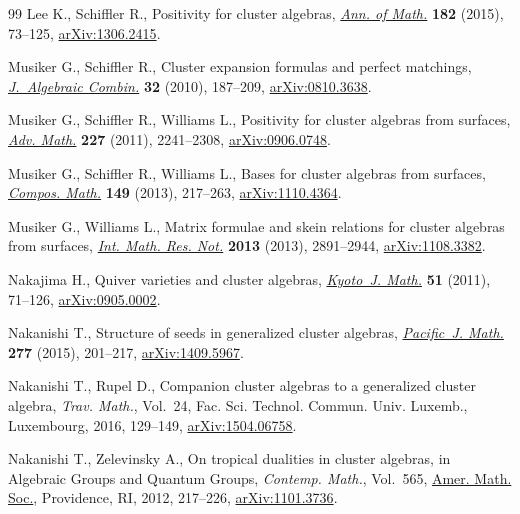 \documentclass[11pt]{article}
\numberwithin{equation}{section}
\begin{document}
\begin{thebibliography}{99}
Lee K., Schiffler R., Positivity for cluster algebras, \href{https://doi.org/10.4007/annals.2015.182.1.2}{\textit{Ann. of Math.}}
 \textbf{182} (2015), 73--125, \href{https://arxiv.org/abs/1306.2415}{arXiv:1306.2415}.

Musiker G., Schiffler R., Cluster expansion formulas and perfect matchings,
 \href{https://doi.org/10.1007/s10801-009-0210-3}{\textit{J.~Algebraic Combin.}} \textbf{32} (2010), 187--209,
 \href{https://arxiv.org/abs/0810.3638}{arXiv:0810.3638}.

Musiker G., Schiffler R., Williams L., Positivity for cluster algebras from
 surfaces, \href{https://doi.org/10.1016/j.aim.2011.04.018}{\textit{Adv. Math.}} \textbf{227} (2011), 2241--2308,
 \href{https://arxiv.org/abs/0906.0748}{arXiv:0906.0748}.

Musiker G., Schiffler R., Williams L., Bases for cluster algebras from
 surfaces, \href{https://doi.org/10.1112/S0010437X12000450}{\textit{Compos. Math.}} \textbf{149} (2013), 217--263,
 \href{https://arxiv.org/abs/1110.4364}{arXiv:1110.4364}.

Musiker G., Williams L., Matrix formulae and skein relations for cluster
 algebras from surfaces, \href{https://doi.org/10.1093/imrn/rns118}{\textit{Int. Math. Res. Not.}} \textbf{2013} (2013),
 2891--2944, \href{https://arxiv.org/abs/1108.3382}{arXiv:1108.3382}.

Nakajima H., Quiver varieties and cluster algebras, \href{https://doi.org/10.1215/0023608X-2010-021}{\textit{Kyoto~J. Math.}}
 \textbf{51} (2011), 71--126, \href{https://arxiv.org/abs/0905.0002}{arXiv:0905.0002}.

Nakanishi T., Structure of seeds in generalized cluster algebras,
 \href{https://doi.org/10.2140/pjm.2015.277.201}{\textit{Pacific~J. Math.}} \textbf{277} (2015), 201--217, \href{https://arxiv.org/abs/1409.5967}{arXiv:1409.5967}.

Nakanishi T., Rupel D., Companion cluster algebras to a generalized cluster
 algebra, \textit{Trav. Math.}, Vol.~24, Fac. Sci. Technol. Commun. Univ. Luxemb., Luxembourg, 2016,
 129--149, \href{https://arxiv.org/abs/1504.06758}{arXiv:1504.06758}.

Nakanishi T., Zelevinsky A., On tropical dualities in cluster algebras, in
 Algebraic Groups and Quantum Groups, \textit{Contemp. Math.}, Vol.~565, \href{https://doi.org/10.1090/conm/565/11159}{Amer.
 Math. Soc.}, Providence, RI, 2012, 217--226, \href{https://arxiv.org/abs/1101.3736}{arXiv:1101.3736}.


\end{thebibliography}
\end{document}
